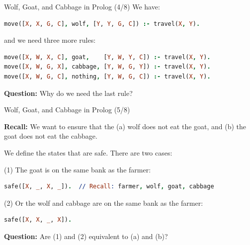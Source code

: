 \begin{frame}[fragile]{Wolf, Goat, and Cabbage in Prolog (4/8)}
We have:

\begin{lstlisting}[language=prolog, xleftmargin=0.5cm]
move([X, X, G, C], wolf, [Y, Y, G, C]) :- travel(X, Y).
\end{lstlisting}

\pause

and we need three more rules:

\begin{lstlisting}[language=prolog, xleftmargin=0.5cm]
move([X, W, X, C], goat,    [Y, W, Y, C]) :- travel(X, Y).
move([X, W, G, X], cabbage, [Y, W, G, Y]) :- travel(X, Y).
move([X, W, G, C], nothing, [Y, W, G, C]) :- travel(X, Y).    
\end{lstlisting}

\pause

\textbf{Question:} Why do we need the last rule?
\end{frame}

\begin{frame}[fragile]{Wolf, Goat, and Cabbage in Prolog (5/8)}

\textbf{Recall:} We want to ensure that the (a) wolf does not eat the goat, and
(b) the goat does not eat the cabbage.

We define the states that are safe. There are two cases: 

(1) The goat is on the same bank as the farmer:

\begin{lstlisting}[language=prolog, xleftmargin=0.5cm]
safe([X, _, X, _]).  // Recall: farmer, wolf, goat, cabbage
\end{lstlisting}

(2) Or the wolf and cabbage are on the same bank as the farmer:

\begin{lstlisting}[language=prolog, xleftmargin=0.5cm]
safe([X, X, _, X]).
\end{lstlisting}

\pause 

\textbf{Question:} Are (1) and (2) equivalent to (a) and (b)?

\end{frame}

